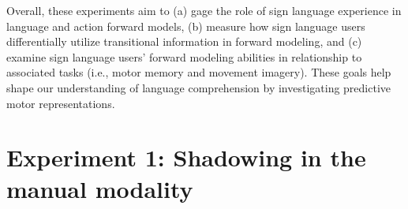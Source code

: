             Overall, these experiments aim to (a) gage the role of sign language experience in language and action forward models, (b) measure how sign language users differentially utilize transitional information in forward modeling, and (c) examine sign language users’ forward modeling abilities in relationship to associated tasks (i.e., motor memory and movement imagery). These goals help shape our understanding of language comprehension by investigating predictive motor representations. \par
        
\section{Experiment 1: Shadowing in the manual modality}  
    \label{ch:shad}
